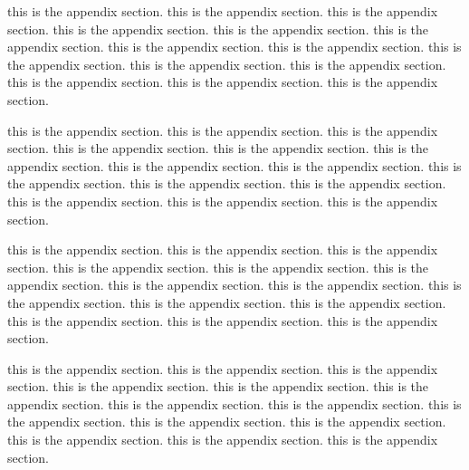 this is the appendix section. this is the appendix section. this is the appendix section. this is the appendix section. this is the appendix section. this is the appendix section. this is the appendix section. this is the appendix section. this is the appendix section. this is the appendix section. this is the appendix section. this is the appendix section. this is the appendix section. this is the appendix section.

this is the appendix section. this is the appendix section. this is the appendix section. this is the appendix section. this is the appendix section. this is the appendix section. this is the appendix section. this is the appendix section. this is the appendix section. this is the appendix section. this is the appendix section. this is the appendix section. this is the appendix section. this is the appendix section.

this is the appendix section. this is the appendix section. this is the appendix section. this is the appendix section. this is the appendix section. this is the appendix section. this is the appendix section. this is the appendix section. this is the appendix section. this is the appendix section. this is the appendix section. this is the appendix section. this is the appendix section. this is the appendix section.

this is the appendix section. this is the appendix section. this is the appendix section. this is the appendix section. this is the appendix section. this is the appendix section. this is the appendix section. this is the appendix section. this is the appendix section. this is the appendix section. this is the appendix section. this is the appendix section. this is the appendix section. this is the appendix section.